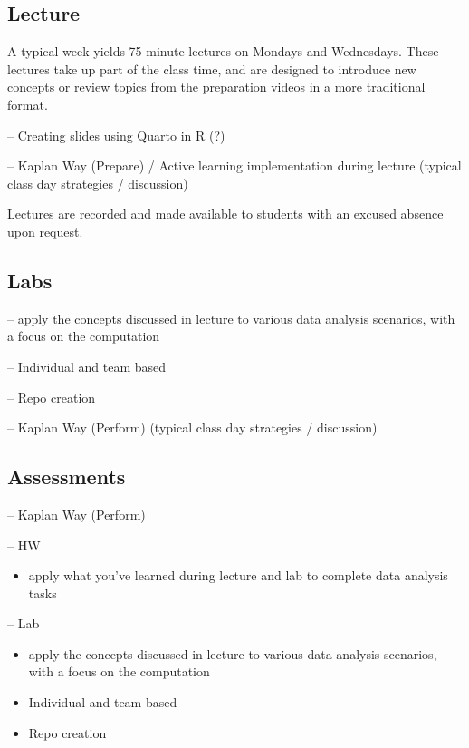 \documentclass[
  12pt]{article}
\providecommand{\tightlist}{%
  \setlength{\itemsep}{0pt}\setlength{\parskip}{0pt}}\usepackage{longtable,booktabs,array}
\begin{document}
\hypertarget{lecture}{%
\subsection{Lecture}\label{lecture}}

A typical week yields 75-minute lectures on Mondays and Wednesdays.
These lectures take up part of the class time, and are designed to
introduce new concepts or review topics from the preparation videos in a
more traditional format.

-- Creating slides using Quarto in R (?)

-- Kaplan Way (Prepare) / Active learning implementation during lecture
(typical class day strategies / discussion)

Lectures are recorded and made available to students with an excused
absence upon request.

\hypertarget{labs}{%
\subsection{Labs}\label{labs}}

-- apply the concepts discussed in lecture to various data analysis
scenarios, with a focus on the computation

-- Individual and team based

-- Repo creation

-- Kaplan Way (Perform) (typical class day strategies / discussion)

\hypertarget{assessments}{%
\subsection{Assessments}\label{assessments}}

-- Kaplan Way (Perform)

-- HW

\begin{itemize}
\tightlist
\item
  apply what you've learned during lecture and lab to complete data
  analysis tasks
\end{itemize}

-- Lab

\begin{itemize}
\item
  apply the concepts discussed in lecture to various data analysis
  scenarios, with a focus on the computation
\item
  Individual and team based
\item
  Repo creation
\end{itemize}
\end{document}
